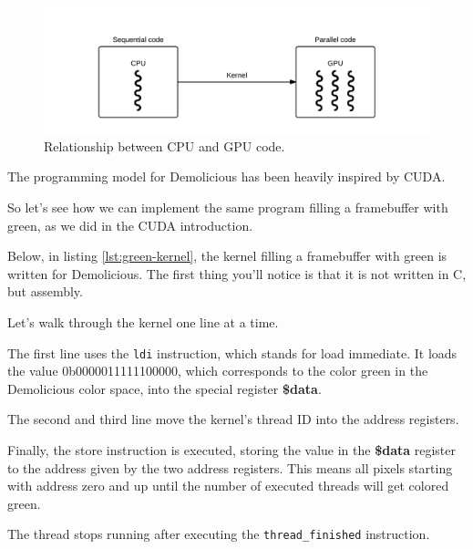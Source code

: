 \documentclass[../main/report.tex]{subfiles}
\begin{document}
\begin{figure}[H]
	\centering
	\includegraphics[width=\textwidth]{../system_overview/diagrams/programming_model_cpu_gpu.png}
	\caption{Relationship between CPU and GPU code.}
	\label{fig:programming_model_cpu_gpu}
\end{figure}

The programming model for Demolicious has been heavily inspired by CUDA.

So let's see how we can implement the same program filling a framebuffer with green, as we did in the CUDA introduction.

Below, in listing \ref{lst:green-kernel}, the kernel filling a framebuffer with green is written for Demolicious.
The first thing you'll notice is that it is not written in C, but assembly.


Let's walk through the kernel one line at a time.

The first line uses the \verb/ldi/ instruction, which stands for load immediate.
It loads the value 0b0000011111100000,
which corresponds to the color green in the Demolicious color space,
into the special register \textbf{\$data}.

The second and third line move the kernel's thread ID into the address registers.

Finally, the store instruction is executed, storing the value in the \textbf{\$data} register
to the address given by the two address registers.
This means all pixels starting with address zero and up until the number of executed threads
will get colored green.

The thread stops running after executing the \verb/thread_finished/ instruction.
\\
\end{document}
